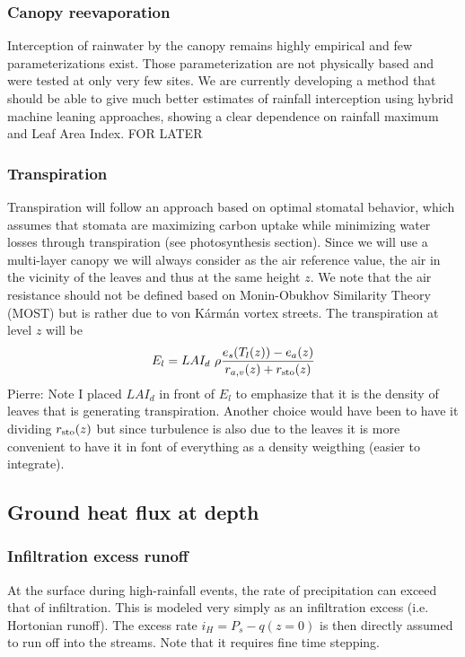 \documentclass{article}
\begin{document}
\subsubsection{Canopy reevaporation}
Interception of rainwater by the canopy remains highly empirical and few parameterizations exist. Those parameterization are not physically based and were tested at only very few sites. We are currently developing a method that should be able to give much better estimates of rainfall interception using hybrid machine leaning approaches, showing a clear dependence on rainfall maximum and Leaf Area Index. FOR LATER

\subsubsection{Transpiration}
Transpiration will follow an approach based on optimal stomatal behavior, which assumes that stomata are maximizing carbon uptake while minimizing water losses through transpiration (see photosynthesis section). 
Since we will use a multi-layer canopy we will always consider as the air reference value, the air in the vicinity of the leaves and thus at the same height $z$. We note that the air resistance should not be defined based on Monin-Obukhov Similarity Theory (MOST) but is rather due to von Kármán vortex streets.
The transpiration at level $z$ will be
\begin{equation}
    E_l = LAI_d \ \rho \frac{e_s(T_l(z))-e_{a}(z)}{r_{a,v}(z)+r_{\rm sto}(z)}
\end{equation}
Pierre: Note I placed $LAI_d$ in front of $E_l$ to emphasize that it is the density of leaves that is generating transpiration. Another choice would have been to have it dividing $r_{\rm sto}(z)$ but since turbulence is also due to the leaves it is more convenient to have it in font of everything as a density weigthing (easier to integrate).

\subsection{Ground heat flux at depth}
\subsubsection{Infiltration excess runoff}
At the surface during high-rainfall events, the rate of precipitation can exceed that of infiltration. This is modeled very simply as an infiltration excess (i.e. Hortonian runoff). The excess rate $i_H = P_s-q(z=0)$ is then directly assumed to run off into the streams. Note that it requires fine time stepping.
\end{document}
